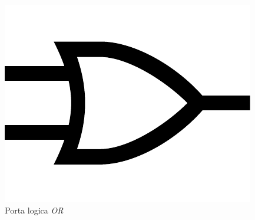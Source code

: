 \begin{frame}
\begin{columns}
		\begin{figure}[!htbp] 
			\centering 
			\includegraphics[width=0.5\linewidth]{images/2_le_architetture/logic_gate_or.pdf}
			\caption{Porta logica \textit{OR}}
		\end{figure}
		
	\end{columns}
	
\end{frame}


